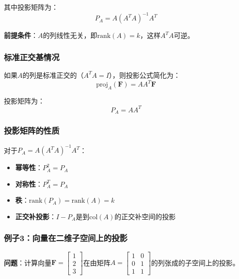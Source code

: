 \documentclass[12pt,a4paper]{article}
\begin{document}
其中投影矩阵为：
\begin{equation}
P_A = A (A^T A)^{-1} A^T
\label{eq:subspace_projection_matrix}
\end{equation}

\textbf{前提条件}：$A$的列线性无关，即$\text{rank}(A) = k$，这样$A^T A$可逆。

\subsubsection{标准正交基情况}

如果$A$的列是标准正交的（$A^T A = I$），则投影公式简化为：
\begin{equation}
\text{proj}_{A}(\bm{F}) = A A^T \bm{F}
\label{eq:orthonormal_projection}
\end{equation}

投影矩阵为：
\begin{equation}
P_A = A A^T
\label{eq:orthonormal_projection_matrix}
\end{equation}

\subsubsection{投影矩阵的性质}

对于$P_A = A (A^T A)^{-1} A^T$：
\begin{itemize}
\item \textbf{幂等性}：$P_A^2 = P_A$
\item \textbf{对称性}：$P_A^T = P_A$
\item \textbf{秩}：$\text{rank}(P_A) = \text{rank}(A) = k$
\item \textbf{正交补投影}：$I - P_A$是到$\text{col}(A)$的正交补空间的投影
\end{itemize}

\subsubsection{例子3：向量在二维子空间上的投影}

\textbf{问题}：计算向量$\bm{F} = \begin{bmatrix} 1 \\ 2 \\ 3 \end{bmatrix}$在由矩阵$A = \begin{bmatrix} 1 & 0 \\ 0 & 1 \\ 1 & 1 \end{bmatrix}$的列张成的子空间上的投影。
\end{document}
